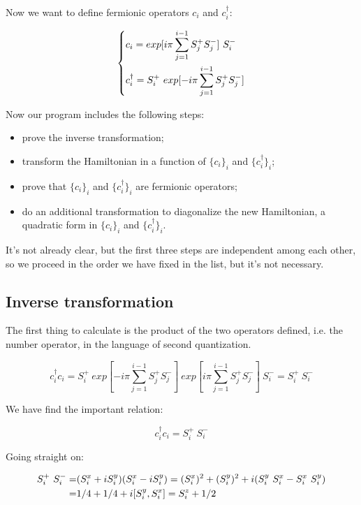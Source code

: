 \documentclass[a4paper,10pt]{article}
\begin{document}
Now we want to define fermionic operators $c_i$ and $c_i^\dagger$:

\begin{equation}
\begin{dcases}
c_i = exp[i\pi \sum_{j=1}^{i-1} S_j^+ S_j^-]~S_i^-\\
c_i^\dagger = S_i^+~exp[-i\pi \sum_{j=1}^{i-1} S_j^+ S_j^-]
\end{dcases}
\label{coperators}
\end{equation}

Now our program includes the following steps:
\begin{itemize}
	\item prove the inverse transformation;
	\item transform the Hamiltonian in a function of $\{c_i\}_i$ and $\{c_i^\dagger\}_i$;
	\item prove that $\{c_i\}_i$ and $\{c_i^\dagger\}_i$ are fermionic operators;
	\item do an additional transformation to diagonalize the new Hamiltonian, a quadratic form in $\{c_i\}_i$ and $\{c_i^\dagger\}_i$.
\end{itemize}

It's not already clear, but the first three steps are independent among each other, so we proceed in the order we have fixed in the list, but it's not necessary.

\pagebreak

\subsection{Inverse transformation}

The first thing to calculate is the product of the two operators defined, i.e. the number operator, in the language of second quantization.

\begin{equation*}
	c_i^\dagger c_i = S_i^+~exp[-i\pi \sum_{j=1}^{i-1} S_j^+ S_j^-]~exp[i\pi \sum_{j=1}^{i-1} S_j^+ S_j^-]~S_i^- = S_i^+~S_i^-
\end{equation*}

We have find the important relation:

\begin{equation}
	c_i^\dagger c_i = S_i^+~S_i^-
\label{cnumber}
\end{equation}

Going straight on:

\begin{align*}
S_i^+~S_i^- =& (S_i^x + i S_i^y)(S_i^x - i S_i^y) = (S_i^x)^2 + (S_i^y)^2 + i(S_i^y~ S_i^x - S_i^x~ S_i^y) \\
 =&1/4 + 1/4 + i\comm{S_i^y}{S_i^x} = S_i^z + 1/2
\end{align*}
\end{document}
